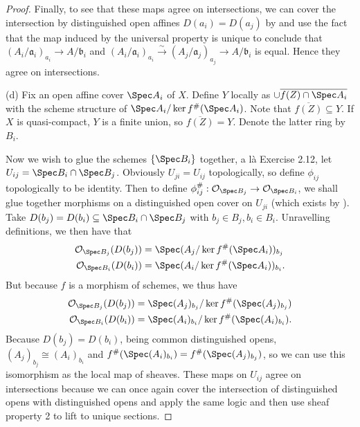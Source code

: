 \begin{proof}
	Finally, to see that these maps agree on intersections, we can cover the intersection by distinguished open affines $D(a_i) = D(a_j) $ by  and use the fact that the map induced by the universal property is unique to conclude that $(A_i / \mathfrak{a}_i)_{a_i} \to A / \mathfrak{b}_i$ and $(A_i / \mathfrak{a}_i)_{a_i} \xrightarrow{\sim} (A_j / \mathfrak{a}_j)_{a_j} \to A / \mathfrak{b}_i$ is equal.
	Hence they agree on intersections.

	(d)
	Fix an open affine cover $\Spec A_i $ of $X $.
	Define $Y $ locally as $\cup \overline{f(Z) \cap \Spec A_i}  $ with the scheme structure of $\Spec A_i / \ker f^\#( \Spec A_i ) $.
	Note that $\overline{f(Z)} \subseteq Y $.
	If $X $ is quasi-compact, $Y $ is a finite union, so $\overline{f(Z)} = Y  $.
	Denote the latter ring by $B_i $.

	Now we wish to glue the schemes $\{\Spec B_i\}   $ together, a l\`a Exercise 2.12, let $U_{ij} = \Spec B_i \cap \Spec B_j $.
	Obviously $U_{ji} = U_{ij} $ topologically, so define $\phi _{ij} $ topologically to be identity.
	Then to define $\phi^\#_{ij}: \mathcal{O}_{\Spec B_j} \to \mathcal{O}_{\Spec B_i}$, we shall glue together morphisms on a distinguished open cover on $U_{ji} $ (which exists by ).
	Take $D(b_j) = D(b_i) \subseteq \Spec B_i\cap \Spec B_j$ with $b_j\in B_j, b_i\in B_i $.
	Unravelling definitions, we then have that
	\begin{align*}
		\mathcal{O}_{\Spec B_j}(D(b_j)) &= \Spec (A_j / \ker f^\#( \Spec A_i ))_{b_j}\\
		\mathcal{O}_{\Spec B_i}(D(b_i)) &= \Spec (A_i / \ker f^\#( \Spec A_i ))_{b_i}.
	\end{align*}
	But because $f $ is a morphism of schemes, we thus have
	\begin{align*}
		\mathcal{O}_{\Spec B_j}(D(b_j)) &= \Spec (A_j)_{b_j} / \ker f^\#( \Spec (A_j)_{b_j} ) \\
		\mathcal{O}_{\Spec B_i}(D(b_i)) &= \Spec (A_i)_{b_i} / \ker f^\#( \Spec (A_i)_{b_i} ).
	\end{align*}
	Because $D(b_j)=D(b_i) $, being common distinguished opens, $(A_j)_{b_j} \cong (A_i)_{b_i} $ and $f^\#(\Spec(A_i)_{b_i}) = f^\#(\Spec(A_j)_{b_j}) $, so we can use this isomorphism as the local map of sheaves.
	These maps on $U_{ij} $ agree on intersections because we can once again cover the intersection of distinguished opens with distinguished opens and apply the same logic and then use sheaf property 2 to lift to unique sections.


\end{proof}
